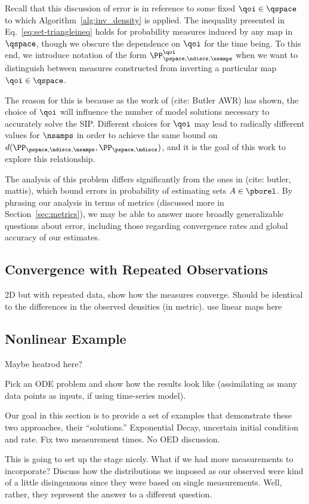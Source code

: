 Recall that this discussion of error is in reference to some fixed $\qoi\in\qspace$ to which Algorithm~\ref{alg:inv_density} is applied.
The inequality presented in Eq.~\eqref{eq:set-triangleineq} holds for probability measures induced by any map in $\qspace$, though we obscure the dependence on $\qoi$ for the time being.
To this end, we introduce notation of the form $\PP_{\pspace, \ndiscs, \nsamps}^{\qoi}$ when we want to distinguish between measures constructed from inverting a particular map $\qoi\in\qspace$.

The reason for this is because as the work of (cite: Butler AWR) has shown, the choice of $\qoi$ will influence the number of model solutions necessary to accurately solve the SIP.
Different choices for $\qoi$ may lead to radically different values for $\nsamps$ in order to achieve the same bound on $d(\PP_{\pspace, \ndiscs, \nsamps}, \PP_{\pspace, \ndiscs})$, and it is the goal of this work to explore this relationship.

The analysis of this problem differs significantly from the ones in (cite: butler, mattis), which bound errors in probability of estimating sets $A\in\pborel$.
By phrasing our analysis in terms of metrics (discussed more in Section~\ref{sec:metrics}), we may be able to answer more broadly generalizable questions about error, including those regarding convergence rates and global accuracy of our estimates.


\subsection{Convergence with Repeated Observations}
2D but with repeated data, show how the measures converge. Should be identical to the differences in the observed densities (in metric).
use linear maps here

\subsection{Nonlinear Example}
Maybe heatrod here?


Pick an ODE problem and show how the results look like (assimilating as many data points as inputs, if using time-series model).

Our goal in this section is to provide a set of examples that demonstrate these two approaches, their ``solutions.''
Exponential Decay, uncertain initial condition and rate. Fix two measurement times. No OED discussion.


This is going to set up the stage nicely.
What if we had more measurements to incorporate? Discuss how the distributions we imposed as our observed were kind of a little disingenuous since they were based on single measurements. Well, rather, they represent the answer to a different question.
